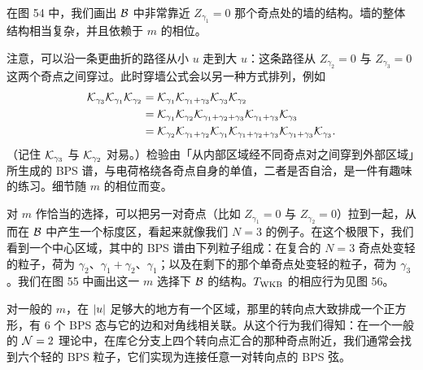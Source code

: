 在图 54 中，我们画出 $\mathcal{B}$ 中非常靠近 $Z_{\gamma_1} = 0$ 那个奇点处的墙的结构。墙的整体结构相当复杂，并且依赖于 $m$ 的相位。


注意，可以沿一条更曲折的路径从小 $u$ 走到大 $u$：这条路径从 $Z_{\gamma_2} = 0$ 与 $Z_{\gamma_3} = 0$ 这两个奇点之间穿过。此时穿墙公式会以另一种方式排列，例如
\begin{equation}
\begin{split}
\mathcal{K}_{\gamma_3} \mathcal{K}_{\gamma_1} \mathcal{K}_{\gamma_2}
&= \mathcal{K}_{\gamma_1} \mathcal{K}_{\gamma_1+\gamma_3} \mathcal{K}_{\gamma_3} \mathcal{K}_{\gamma_2} \\
&= \mathcal{K}_{\gamma_1} \mathcal{K}_{\gamma_2} \mathcal{K}_{\gamma_1+\gamma_2+\gamma_3}\mathcal{K}_{\gamma_1+\gamma_3} \mathcal{K}_{\gamma_3} \\
&= \mathcal{K}_{\gamma_2} \mathcal{K}_{\gamma_1+\gamma_2}\mathcal{K}_{\gamma_1} \mathcal{K}_{\gamma_1+\gamma_2+\gamma_3}\mathcal{K}_{\gamma_1+\gamma_3} \mathcal{K}_{\gamma_3}.
\end{split}
\end{equation}
（记住 $\mathcal{K}_{\gamma_3}$ 与 $\mathcal{K}_{\gamma_2}$ 对易。）检验由「从内部区域经不同奇点对之间穿到外部区域」所生成的 BPS 谱，与电荷格绕各奇点自身的单值，二者是否自洽，是一件有趣味的练习。细节随 $m$ 的相位而变。

对 $m$ 作恰当的选择，可以把另一对奇点（比如 $Z_{\gamma_1} = 0$ 与 $Z_{\gamma_2} = 0$）拉到一起，从而在 $\mathcal{B}$ 中产生一个标度区，看起来就像我们 $N=3$ 的例子。在这个极限下，我们看到一个中心区域，其中的 BPS 谱由下列粒子组成：在复合的 $N=3$ 奇点处变轻的粒子，荷为 $\gamma_2$、$\gamma_1+\gamma_2$、$\gamma_1$；以及在剩下的那个单奇点处变轻的粒子，荷为 $\gamma_3$。我们在图 55 中画出这一 $m$ 选择下 $\mathcal{B}$ 的结构。$T_{\rm WKB}$ 的相应行为见图 56。



对一般的 $m$，在 $\lvert u \rvert$ 足够大的地方有一个区域，那里的转向点大致排成一个正方形，有 6 个 BPS 态与它的边和对角线相关联。从这个行为我们得知：在一个一般的 $\mathcal{N}=2$ 理论中，在库仑分支上四个转向点汇合的那种奇点附近，我们通常会找到六个轻的 BPS 粒子，它们实现为连接任意一对转向点的 BPS 弦。

